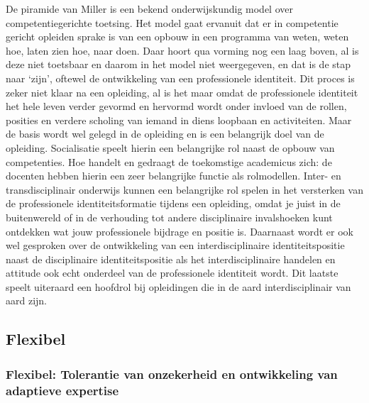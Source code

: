 \documentclass[smallauthor, chapterhaspagenum, nochapterinheader, pagenuminheader,  bigchapnum,medium2, tocpages, garamond, titleinheader]{jote-book}
\begin{document}
	De piramide van Miller is een bekend onderwijskundig model over competentiegerichte toetsing. Het model gaat ervanuit dat er in competentie gericht opleiden sprake is van een opbouw in een programma van weten, weten hoe, laten zien hoe, naar doen. Daar hoort qua vorming nog een laag boven, al is deze niet toetsbaar en daarom in het model niet weergegeven, en dat is de stap naar ‘zijn', oftewel de ontwikkeling van een professionele identiteit. Dit proces is zeker niet klaar na een opleiding, al is het maar omdat de professionele identiteit het hele leven verder gevormd en hervormd wordt onder invloed van de rollen, posities en verdere scholing van iemand in diens loopbaan en activiteiten. Maar de basis wordt wel gelegd in de opleiding en is een belangrijk doel van de opleiding. Socialisatie speelt hierin een belangrijke rol naast de opbouw van competenties. Hoe handelt en gedraagt de toekomstige academicus zich: de docenten hebben hierin een zeer belangrijke functie als rolmodellen. Inter- en transdisciplinair onderwijs kunnen een belangrijke rol spelen in het versterken van de professionele identiteitsformatie tijdens een opleiding, omdat je juist in de buitenwereld of in de verhouding tot andere disciplinaire invalshoeken kunt ontdekken wat jouw professionele bijdrage en positie is. Daarnaast wordt er ook wel gesproken over de ontwikkeling van een interdisciplinaire identiteitspositie naast de disciplinaire identiteitspositie als het interdisciplinaire handelen en attitude ook echt onderdeel van de professionele identiteit wordt. Dit laatste speelt uiteraard een hoofdrol bij opleidingen die in de aard interdisciplinair van aard zijn.



	\subsection{Flexibel}



	\subsubsection{Flexibel: Tolerantie van onzekerheid en ontwikkeling van adaptieve expertise}
\end{document}
